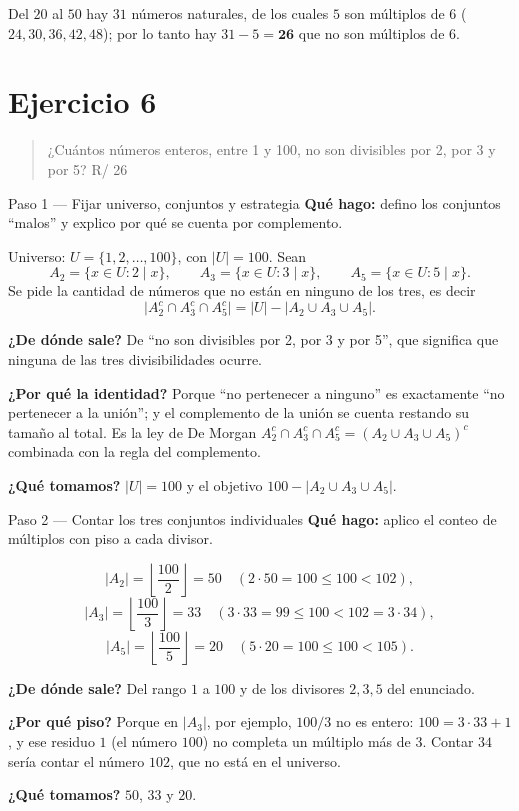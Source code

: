 \documentclass[11pt]{article}
\begin{document}
\begin{resp}
Del $20$ al $50$ hay $31$ números naturales, de los cuales $5$ son múltiplos de $6$ ($24,30,36,42,48$); por lo tanto hay $31-5=\mathbf{26}$ que no son múltiplos de $6$.
\end{resp}

\section*{Ejercicio 6}

\begin{quote}
¿Cuántos números enteros, entre 1 y 100, no son divisibles por 2, por 3 y por 5? \hfill R/ 26
\end{quote}

\begin{paso}{Paso 1 --- Fijar universo, conjuntos y estrategia}
\textbf{Qué hago:} defino los conjuntos ``malos'' y explico por qué se cuenta por complemento.

Universo: $U=\{1,2,\dots,100\}$, con $|U|=100$. Sean
\[
A_2=\{x\in U: 2\mid x\},\qquad A_3=\{x\in U: 3\mid x\},\qquad A_5=\{x\in U: 5\mid x\} .
\]
Se pide la cantidad de números que no están en ninguno de los tres, es decir
\[
\bigl|A_2^{c}\cap A_3^{c}\cap A_5^{c}\bigr| = |U| - |A_2\cup A_3\cup A_5| .
\]

\textbf{¿De dónde sale?} De ``no son divisibles por 2, por 3 y por 5'', que significa que ninguna de las tres divisibilidades ocurre.

\textbf{¿Por qué la identidad?} Porque ``no pertenecer a ninguno'' es exactamente ``no pertenecer a la unión''; y el complemento de la unión se cuenta restando su tamaño al total. Es la ley de De Morgan $A_2^c\cap A_3^c\cap A_5^c = (A_2\cup A_3\cup A_5)^c$ combinada con la regla del complemento.

\textbf{¿Qué tomamos?} $|U|=100$ y el objetivo $100-|A_2\cup A_3\cup A_5|$.
\end{paso}

\begin{paso}{Paso 2 --- Contar los tres conjuntos individuales}
\textbf{Qué hago:} aplico el conteo de múltiplos con piso a cada divisor.

\[
|A_2| = \left\lfloor \frac{100}{2}\right\rfloor = 50 \quad (2\cdot 50 = 100\le 100 < 102),
\]
\[
|A_3| = \left\lfloor \frac{100}{3}\right\rfloor = 33 \quad (3\cdot 33 = 99\le 100 < 102 = 3\cdot 34),
\]
\[
|A_5| = \left\lfloor \frac{100}{5}\right\rfloor = 20 \quad (5\cdot 20 = 100\le 100 < 105).
\]

\textbf{¿De dónde sale?} Del rango $1$ a $100$ y de los divisores $2,3,5$ del enunciado.

\textbf{¿Por qué piso?} Porque en $|A_3|$, por ejemplo, $100/3$ no es entero: $100 = 3\cdot 33 + 1$, y ese residuo $1$ (el número $100$) no completa un múltiplo más de $3$. Contar $34$ sería contar el número $102$, que no está en el universo.

\textbf{¿Qué tomamos?} $50$, $33$ y $20$.
\end{paso}
\end{document}
